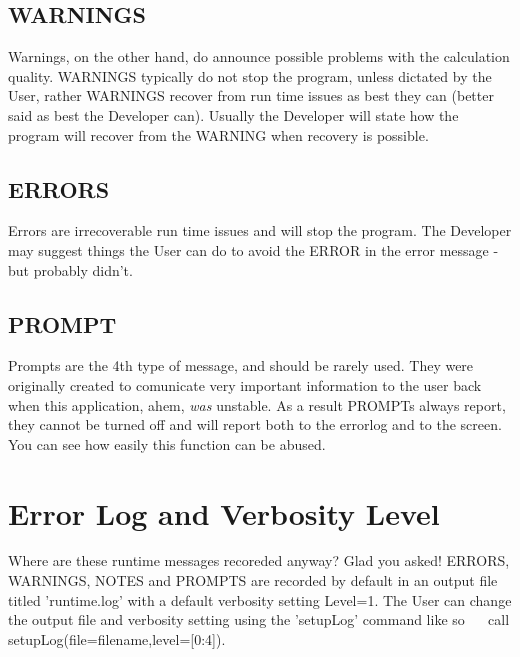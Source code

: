 \hypertarget{_interface_WARNINGS}{}\subsection{W\+A\+R\+N\+I\+N\+G\+S}\label{_interface_WARNINGS}
Warnings, on the other hand, do announce possible problems with the calculation quality. W\+A\+R\+N\+I\+N\+G\+S typically do not stop the program, unless dictated by the User, rather W\+A\+R\+N\+I\+N\+G\+S recover from run time issues as best they can (better said as best the Developer can). Usually the Developer will state how the program will recover from the W\+A\+R\+N\+I\+N\+G when recovery is possible.~\newline
\hypertarget{_interface_ERRORS}{}\subsection{E\+R\+R\+O\+R\+S}\label{_interface_ERRORS}
Errors are irrecoverable run time issues and will stop the program. The Developer may suggest things the User can do to avoid the E\+R\+R\+O\+R in the error message -\/ but probably didn't.~\newline
\hypertarget{_interface_PROMPT}{}\subsection{P\+R\+O\+M\+P\+T}\label{_interface_PROMPT}
Prompts are the 4th type of message, and should be rarely used. They were originally created to comunicate very important information to the user back when this application, ahem, {\itshape was} unstable. As a result P\+R\+O\+M\+P\+Ts always report, they cannot be turned off and will report both to the errorlog and to the screen. You can see how easily this function can be abused.~\newline
\hypertarget{_interface_ERRORLOG}{}\section{Error Log and Verbosity Level}\label{_interface_ERRORLOG}
Where are these runtime messages recoreded anyway? Glad you asked! E\+R\+R\+O\+R\+S, W\+A\+R\+N\+I\+N\+G\+S, N\+O\+T\+E\+S and P\+R\+O\+M\+P\+T\+S are recorded by default in an output file titled 'runtime.\+log' with a default verbosity setting Level=1. The User can change the output file and verbosity setting using the 'setup\+Log' command like so~\newline
~\newline
 call setup\+Log(file=filename,level=\mbox{[}0\+:4\mbox{]}).~\newline
